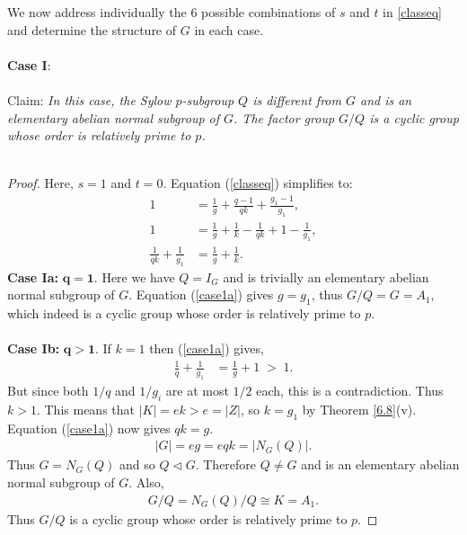 \documentclass[a4paper , 11pt]{book}
\theoremstyle{definition}
\theoremstyle{remark}
\begin{document}
We now address individually the 6 possible combinations of $s$ and $t$ in \eqref{classeq} and determine the structure of $G$ in each case. \\
\\
\textbf{Case I}:\\
\\
Claim: \textit{In this case, the Sylow $p$-subgroup $Q$ is different from $G$ and is an elementary abelian normal subgroup of $G$. The factor group $G/Q$ is a cyclic group whose order is relatively prime to $p$.} \\
\\
\begin{proof} Here, $s = 1$ and $t = 0$. Equation (\ref{classeq}) simplifies to:
\begin{align}\label{case1a} 1 &= \frac{1}{g} + \frac{q-1}{qk} + \frac{g_1-1}{g_1}, \nonumber
\\ 1 &= \frac{1}{g} + \frac{1}{k} - \frac{1}{qk}  + 1 - \frac{1}{g_1}, \nonumber
\\ \frac{1}{qk}  + \frac{1}{g_1} &= \frac{1}{g} + \frac{1}{k}.
\end{align}
\textbullet \space \textbf{Case Ia:} $\pmb{q = 1}$. Here we have $Q = I_G$ and is trivially an elementary abelian normal subgroup of $G$. Equation (\ref{case1a}) gives $g=g_1$, thus $G/Q = G = A_1$, which indeed is a cyclic group whose order is relatively prime to $p$. \\
\\
\textbullet \space \textbf{Case Ib:} $\pmb{q > 1}$. If $k=1$ then (\ref{case1a}) gives,
\begin{align*} \frac{1}{q}  + \frac{1}{g_1} &= \frac{1}{g} + 1 \; > \; 1.
\end{align*}
But since both $1/q$ and $1/g_i$ are at most $1/2$ each, this is a contradiction. Thus $k > 1$. This means that $|K| = ek > e = |Z|$, so $k = g_1$ by Theorem \ref{6.8}(v). Equation (\ref{case1a}) now gives $qk = g$.
\begin{align*} |G| = eg = eqk = |N_G(Q)|.
\end{align*}
Thus $G = N_G(Q)$ and so $Q \vartriangleleft G$. Therefore $Q \neq G$ and is an elementary abelian normal subgroup of $G$. Also,
\begin{align*} G/Q = N_G(Q)/Q \cong K = A_1.
\end{align*}
Thus $G/Q$ is a cyclic group whose order is relatively prime to $p$.

\end{proof}
\end{document}
